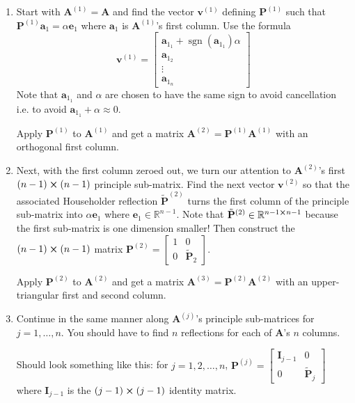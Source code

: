 \documentclass[11pt, a4paper]{article}
\newcommand{\R}{\mathbb{R}} %
\newcommand{\mat}[1]{\mathbf{#1}} %
\begin{document}
\begin{enumerate}
	 
	\item Start with $ \mat{A}^{(1)} = \mat{A} $ and find the vector $ \bm{v}^{(1)} $ defining $ \mat{P}^{(1)} $ such that $ \mat{P}^{(1)} \bm{a}_1 = \alpha \bm{e}_1 $ where $ \bm{a}_{1} $ is $ \mat{A}^{(1)} $'s first column. Use the formula
	\[
		\bm{v}^{(1)} = 
		\begin{bmatrix}
			\bm{a}_{1_{1}} + \operatorname{sgn}(\bm{a}_{1_{1}}) \alpha\\
			\bm{a}_{1_{2}}\\
			\vdots\\
			\bm{a}_{1_{n}}
		\end{bmatrix}
	\]
	Note that $ \bm{a}_{1_{1}} $ and $ \alpha $ are chosen to have the same sign to avoid cancellation i.e. to avoid $ \bm{a}_{1_{1}} + \alpha \approx 0$.
	
	Apply $ \mat{P}^{(1)} $ to $ \mat{A}^{(1)} $ and get a matrix $ \mat{A}^{(2)} = \mat{P}^{(1)} \mat{A}^{(1)} $ with an orthogonal first column. 
	
	\item Next, with the first column zeroed out, we turn our attention to $ \mat{A}^{(2)} $'s first $ (n-1) \cross (n-1) $ principle sub-matrix. Find the next vector $ \bm{v}^{(2)} $ so that the associated Householder reflection $ \tilde{\mat{P}}^{(2)} $ turns the first column of the principle sub-matrix into $ \alpha \bm{e}_{1} $ where $ \bm{e}_{1} \in \R^{n-1} $. Note that $ \tilde{\mat{P}}^{(2)} \in \R^{n-1 \cross n-1}$ because the first sub-matrix is one dimension smaller! Then construct the $ (n-1) \cross (n-1) $ matrix $ \mat{P}^{(2)} = \begin{bmatrix} 1 & 0\\ 0 & \tilde{\mat{P}}_{2} \end{bmatrix} $.
	
	Apply $ \mat{P}^{(2)} $ to $ \mat{A}^{(2)} $ and get a matrix $ \mat{A}^{(3)} = \mat{P}^{(2)} \mat{A}^{(2)} $ with an upper-triangular first and second column.
	
	\item Continue in the same manner along $ \mat{A}^{(j)} $'s principle sub-matrices for $ j = 1, \ldots, n $. You should have to find $ n $ reflections for each of $ \mat{A} $'s $ n $ columns. 
	
	Should look something like this: for $ j = 1, 2, \ldots, n $, $ \mat{P}^{(j)} = \begin{bmatrix}
		\mat{I}_{j-1} & 0\\ 0 & \tilde{\mat{P}}_{j}
	\end{bmatrix} $ where $ \mat{I}_{j-1} $ is the $ (j-1) \cross (j-1) $ identity matrix.
	

\end{enumerate}
\end{document}
